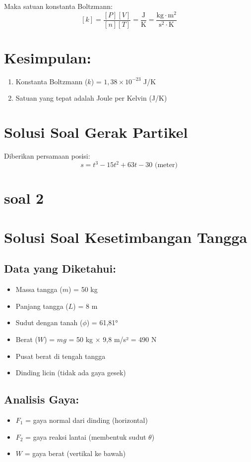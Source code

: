 \documentclass{article}
\begin{document}
Maka satuan konstanta Boltzmann:
\[[k] = \frac{[P][V]}{[n][T]} = \frac{\text{J}}{\text{K}} = \frac{\text{kg} \cdot \text{m}^2}{\text{s}^2 \cdot \text{K}}\]

\section*{Kesimpulan:}
\begin{enumerate}
\item Konstanta Boltzmann ($k$) = $1,38 \times 10^{-23}$ J/K
\item Satuan yang tepat adalah Joule per Kelvin (J/K)
\end{enumerate}

\section*{Solusi Soal Gerak Partikel}
Diberikan persamaan posisi:
\[s = t^3 - 15t^2 + 63t - 30 \text{ (meter)}\]

\section {soal 2}
\section*{Solusi Soal Kesetimbangan Tangga}

\subsection*{Data yang Diketahui:}
\begin{itemize}
\item Massa tangga ($m$) = 50 kg
\item Panjang tangga ($L$) = 8 m
\item Sudut dengan tanah ($\phi$) = 61,81°
\item Berat ($W$) = $mg$ = 50 kg × 9,8 m/s² = 490 N
\item Pusat berat di tengah tangga
\item Dinding licin (tidak ada gaya gesek)
\end{itemize}

\subsection*{Analisis Gaya:}
\begin{itemize}
\item $F_1$ = gaya normal dari dinding (horizontal)
\item $F_2$ = gaya reaksi lantai (membentuk sudut $\theta$)
\item $W$ = gaya berat (vertikal ke bawah)
\end{itemize}
\end{document}
